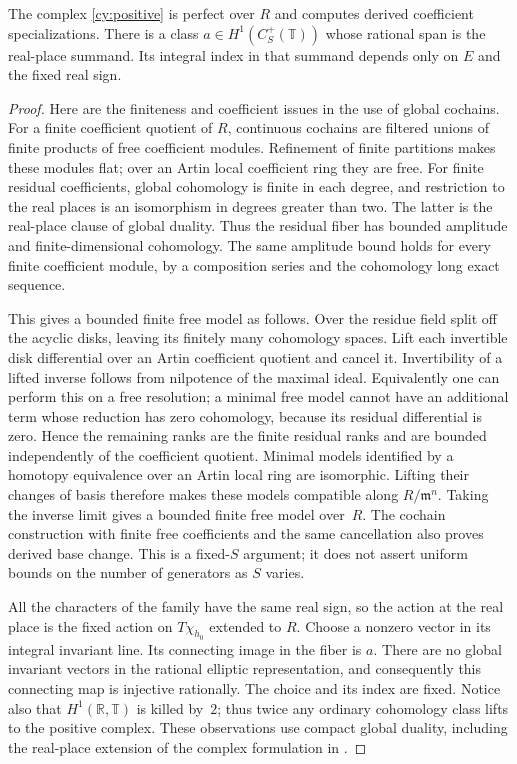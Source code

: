 \begin{lemma}\label{cy:perfect}
The complex \eqref{cy:positive} is perfect over $R$ and computes derived
coefficient specializations.  There is a class $a\in H^1(C_S^+(\mathbb T))$
whose rational span is the real-place summand.  Its integral index in
that summand depends only on $E$ and the fixed real sign.
\end{lemma}
\begin{proof}
Here are the finiteness and coefficient issues in the use of global
cochains.  For a finite coefficient quotient of $R$, continuous cochains
are filtered unions of finite products of free coefficient modules.
Refinement of finite partitions makes these modules flat; over an Artin
local coefficient ring they are free.  For finite residual coefficients,
global cohomology is finite in each degree, and restriction to the real
places is an isomorphism in degrees greater than two.  The latter is the
real-place clause of global duality.  Thus the residual fiber has bounded
amplitude and finite-dimensional cohomology.  The same amplitude bound
holds for every finite coefficient module, by a composition series and
the cohomology long exact sequence.

This gives a bounded finite free model as follows.  Over the residue
field split off the acyclic disks, leaving its finitely many cohomology
spaces.  Lift each invertible disk differential over an Artin coefficient
quotient and cancel it.  Invertibility of a lifted inverse follows from
nilpotence of the maximal ideal.  Equivalently one can perform this on a
free resolution; a minimal free model cannot have an additional term
whose reduction has zero cohomology, because its residual differential
is zero.  Hence the remaining ranks are the finite residual ranks and
are bounded independently of the coefficient quotient.  Minimal models
identified by a homotopy equivalence over an Artin local ring are
isomorphic.  Lifting their changes of basis therefore makes these models
compatible along $R/\mathfrak m^n$.  Taking the inverse limit gives a
bounded finite free model over~$R$.  The cochain construction with finite
free coefficients and the same cancellation also proves derived base
change.  This is a fixed-$S$ argument; it does not assert uniform bounds
on the number of generators as $S$ varies.

All the characters of the family have the same real sign, so the action
at the real place is the fixed action on $T\chi_{h_0}$ extended to $R$.
Choose a nonzero vector in its integral invariant line.  Its connecting
image in the fiber is $a$.  There are no global invariant vectors in the
rational elliptic representation, and consequently this connecting map
is injective rationally.  The choice and its index are fixed.  Notice also
that $H^1(\mathbb R,\mathbb T)$ is killed by~$2$; thus twice any ordinary
cohomology class lifts to the positive complex.  These observations use
compact global duality, including the real-place extension
\cite[Sections~5.7 and~6.9.1]{Nekovar2006} of the complex formulation
in \cite[Theorem~6.3.4]{Nekovar2006}.
\end{proof}

